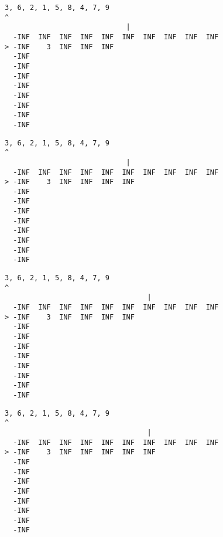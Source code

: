 { \begin{verbatim}
3, 6, 2, 1, 5, 8, 4, 7, 9
^
                             |
  -INF  INF  INF  INF  INF  INF  INF  INF  INF  INF
> -INF    3  INF  INF  INF                         
  -INF                                             
  -INF                                             
  -INF                                             
  -INF                                             
  -INF                                             
  -INF                                             
  -INF                                             
  -INF                                             
\end{verbatim} }

{ \begin{verbatim}
3, 6, 2, 1, 5, 8, 4, 7, 9
^
                             |
  -INF  INF  INF  INF  INF  INF  INF  INF  INF  INF
> -INF    3  INF  INF  INF  INF                    
  -INF                                             
  -INF                                             
  -INF                                             
  -INF                                             
  -INF                                             
  -INF                                             
  -INF                                             
  -INF                                             
\end{verbatim} }

{ \begin{verbatim}
3, 6, 2, 1, 5, 8, 4, 7, 9
^
                                  |
  -INF  INF  INF  INF  INF  INF  INF  INF  INF  INF
> -INF    3  INF  INF  INF  INF                    
  -INF                                             
  -INF                                             
  -INF                                             
  -INF                                             
  -INF                                             
  -INF                                             
  -INF                                             
  -INF                                             
\end{verbatim} }

{ \begin{verbatim}
3, 6, 2, 1, 5, 8, 4, 7, 9
^
                                  |
  -INF  INF  INF  INF  INF  INF  INF  INF  INF  INF
> -INF    3  INF  INF  INF  INF  INF               
  -INF                                             
  -INF                                             
  -INF                                             
  -INF                                             
  -INF                                             
  -INF                                             
  -INF                                             
  -INF                                             
\end{verbatim} }

